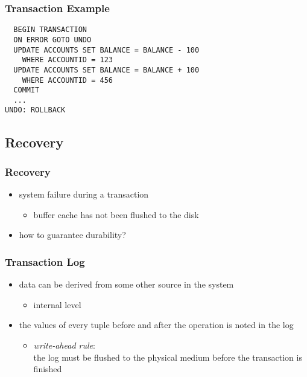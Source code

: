 \documentclass[dvipsnames]{beamer}
\theoremstyle{plain}
\begin{document}
\begin{frame}[fragile]
  \frametitle{Transaction Example}

  \begin{example}
    \begin{lstlisting}
  BEGIN TRANSACTION
  ON ERROR GOTO UNDO
  UPDATE ACCOUNTS SET BALANCE = BALANCE - 100
    WHERE ACCOUNTID = 123
  UPDATE ACCOUNTS SET BALANCE = BALANCE + 100
    WHERE ACCOUNTID = 456
  COMMIT
  ...
UNDO: ROLLBACK
    \end{lstlisting}
  \end{example}
\end{frame}

\subsection{Recovery}

\begin{frame}
  \frametitle{Recovery}

  \begin{itemize}
    \item system failure during a transaction
    \begin{itemize}
      \item buffer cache has not been flushed to the disk
    \end{itemize}

    \pause
    \item how to guarantee durability?
  \end{itemize}
\end{frame}

\begin{frame}
  \frametitle{Transaction Log}

  \begin{itemize}
    \item data can be derived from some other source in the system
    \begin{itemize}
      \item internal level
    \end{itemize}

    \pause
    \medskip
    \item the values of every tuple before and after the operation is noted
      in the \alert{log}
      \begin{itemize}
        \item \emph{write-ahead rule}:\\
          the log must be flushed to the physical medium before the transaction
          is finished
      \end{itemize}
  \end{itemize}
\end{frame}
\end{document}
